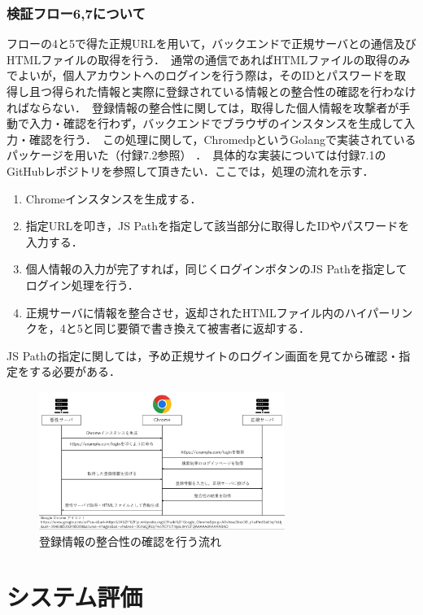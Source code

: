 \documentclass[dvipdfmx,twocolumn]{jsarticle}
\begin{document}
            \subsubsection{検証フロー6,7について}
                フローの4と5で得た正規URLを用いて，バックエンドで正規サーバとの通信及びHTMLファイルの取得を行う．\
                通常の通信であればHTMLファイルの取得のみでよいが，個人アカウントへのログインを行う際は，そのIDとパスワードを取得し且つ得られた情報と実際に登録されている情報との整合性の確認を行わなければならない．\
                登録情報の整合性に関しては，取得した個人情報を攻撃者が手動で入力・確認を行わず，バックエンドでブラウザのインスタンスを生成して入力・確認を行う．\
                この処理に関して，ChromedpというGolangで実装されているパッケージを用いた（付録7.2参照） ．\
                具体的な実装については付録7.1のGitHubレポジトリを参照して頂きたい．ここでは，処理の流れを示す．\
                \begin{enumerate}
                    \item Chromeインスタンスを生成する．
                    \item 指定URLを叩き，JS Pathを指定して該当部分に取得したIDやパスワードを入力する．
                    \item 個人情報の入力が完了すれば，同じくログインボタンのJS Pathを指定してログイン処理を行う．
                    \item 正規サーバに情報を整合させ，返却されたHTMLファイル内のハイパーリンクを，4と5と同じ要領で書き換えて被害者に返却する．
                \end{enumerate}
                JS Pathの指定に関しては，予め正規サイトのログイン画面を見てから確認・指定をする必要がある．\
                \begin{figure}[t]
                    \centering
                    \includegraphics[width=8cm]{img/vc-vf-6-7.png}
                    \caption{登録情報の整合性の確認を行う流れ}
                    \label{flow-6-7}
                \end{figure}
    \section{システム評価}
\end{document}
